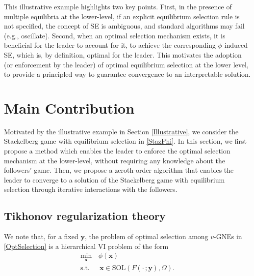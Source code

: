 \documentclass[letterpaper, 10 pt, conference]{ieeeconf}
\newcommand\xbf{\mathbf{x}}
\newcommand\ybf{\mathbf{y}}
\begin{document}
This illustrative example highlights two key points. First, in the presence of multiple equilibria at the lower-level, if an explicit equilibrium selection rule is not specified, the concept of SE is ambiguous, and standard algorithms may fail (e.g., oscillate). Second, when an optimal selection mechanism exists, it is beneficial for the leader to account for it, to achieve the corresponding $\phi$-induced SE, which is, by definition, optimal for the leader.
This motivates the adoption (or enforcement by the leader) of optimal equilibrium selection at the lower level, to provide a principled way to guarantee convergence to an interpretable solution.
\section{Main Contribution} \label{Contribution}
Motivated by the illustrative example in Section \ref{Illustrative}, we consider the Stackelberg game with equilibrium selection in \eqref{StazPhi}. In this section, we first propose a method which enables the leader to enforce the optimal selection mechanism at the lower-level, without requiring any knowledge about the followers' game. Then, we propose a zeroth-order algorithm that enables the leader to converge to a solution of the Stackelberg game with equilibrium selection through iterative interactions with the followers. 
\subsection{Tikhonov regularization theory}
We note that, for a fixed $\ybf$, the problem of optimal selection among $v$-GNEs in \eqref{OptSelection} is a hierarchical VI problem of the form \cite[Eq. (16)]{benenatix2023optimal}
\begin{equation}\label{VI}
\begin{aligned}
\underset{\xbf } {\min} \, &\phi(\xbf)
\\
\mathrm{s.t.} \,& \, \xbf \in \mathrm{SOL}(F(\cdot\,;\ybf), \Omega). 
\end{aligned}
\end{equation}
\end{document}
